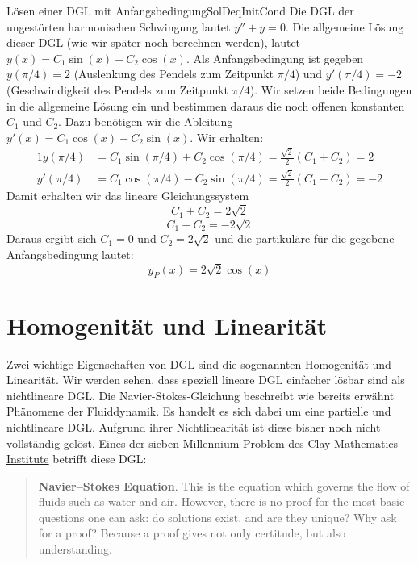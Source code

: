 \begin{example}{Lösen einer DGL mit Anfangsbedingung}{SolDeqInitCond}
    Die DGL der ungestörten harmonischen Schwingung lautet $y''+y=0$. Die allgemeine Lösung dieser DGL (wie wir später noch berechnen werden), lautet $y(x) = C_1 \sin(x) + C_2 \cos(x)$. Als Anfangsbedingung ist gegeben $y(\pi/4)=2$ (Auslenkung des Pendels zum Zeitpunkt $\pi/4$) und $y'(\pi/4)=-2$ (Geschwindigkeit des Pendels zum Zeitpunkt $\pi/4$). Wir setzen beide Bedingungen in die allgemeine Lösung ein und bestimmen daraus die noch offenen konstanten $C_1$ und $C_2$. Dazu benötigen wir die Ableitung $y'(x) = C_1\cos(x) - C_2\sin(x)$. Wir erhalten:
    \begin{alignat*}{1}
        y(\pi/4) &= C_1 \sin(\pi/4) + C_2\cos(\pi/4) = \frac{\sqrt{2}}{2} (C_1+C_2) = 2 \\
        y'(\pi/4) &= C_1 \cos(\pi/4) - C_2\sin(\pi/4) = \frac{\sqrt{2}}{2} (C_1-C_2) = -2
    \end{alignat*}
    Damit erhalten wir das lineare Gleichungssystem
    $$
        C_1+C_2=2\sqrt{2}
    $$
    $$
        C_1-C_2=-2\sqrt{2}
    $$
    Daraus ergibt sich $C_1=0$ und $C_2=2\sqrt{2}$ und die partikuläre für die gegebene Anfangsbedingung lautet:
    $$
        y_P(x) = 2\sqrt{2}\cos(x)
    $$
\end{example}

\section{Homogenität und Linearität}

Zwei wichtige Eigenschaften von DGL sind die sogenannten Homogenität und Linearität. Wir werden sehen, dass speziell lineare DGL einfacher lösbar sind als nichtlineare DGL. Die Navier-Stokes-Gleichung beschreibt wie bereits erwähnt Phänomene der Fluiddynamik. Es handelt es sich dabei um eine partielle und nichtlineare DGL. Aufgrund ihrer Nichtlinearität ist diese bisher noch nicht vollständig gelöst. Eines der sieben Millennium-Problem des \href{http://www.claymath.org/millennium-problems}{Clay Mathematics Institute} betrifft diese DGL:

\begin{quotation}
    \textbf{Navier–Stokes Equation}. This is the equation which governs the flow of fluids such as water and air. However, there is no proof for the most basic questions one can ask: do solutions exist, and are they unique? Why ask for a proof? Because a proof gives not only certitude, but also understanding.
\end{quotation}

